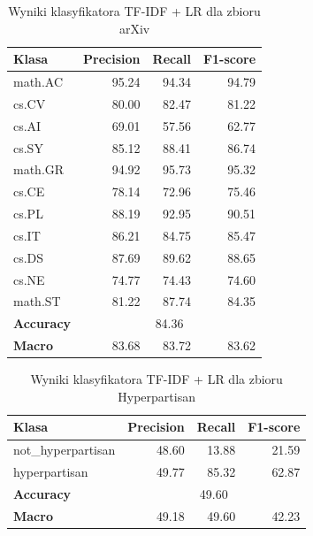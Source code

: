\documentclass[a4paper,11pt,twoside]{report}
\theoremstyle{definition}
\begin{document}
\begin{table}[h!]
\centering
\caption{Wyniki klasyfikatora TF-IDF + LR dla zbioru arXiv}
\label{tab:baseline-arxiv}
\smallskip
\footnotesize
\begin{tabular}{@{}lrrr@{}}
\toprule
\textbf{Klasa} & \textbf{Precision} & \textbf{Recall} & \textbf{F1-score} \\
\midrule
math.AC & 95.24 & 94.34 & 94.79 \\
cs.CV   & 80.00 & 82.47 & 81.22 \\
cs.AI   & 69.01 & 57.56 & 62.77 \\
cs.SY   & 85.12 & 88.41 & 86.74 \\
math.GR & 94.92 & 95.73 & 95.32 \\
cs.CE   & 78.14 & 72.96 & 75.46 \\
cs.PL   & 88.19 & 92.95 & 90.51 \\
cs.IT   & 86.21 & 84.75 & 85.47 \\
cs.DS   & 87.69 & 89.62 & 88.65 \\
cs.NE   & 74.77 & 74.43 & 74.60 \\
math.ST & 81.22 & 87.74 & 84.35 \\
\midrule
\textbf{Accuracy} & \multicolumn{3}{c}{84.36} \\
\textbf{Macro} & 83.68 & 83.72 & 83.62 \\
\bottomrule
\end{tabular}
\end{table}


\begin{table}[h!]   
\centering
\caption{Wyniki klasyfikatora TF-IDF + LR dla zbioru Hyperpartisan}
\label{tab:baseline-hyper}
\smallskip
\small
\begin{tabular}{@{}lrrr@{}}
\toprule
\textbf{Klasa} & \textbf{Precision} & \textbf{Recall} & \textbf{F1-score} \\
\midrule
not\_hyperpartisan & 48.60 & 13.88 & 21.59 \\
hyperpartisan      & 49.77 & 85.32 & 62.87 \\
\midrule
\textbf{Accuracy} & \multicolumn{3}{c}{49.60} \\
\textbf{Macro} & 49.18 & 49.60 & 42.23 \\
\bottomrule
\end{tabular}
\end{table}



\FloatBarrier


\setcounter{table}{0}
\end{document}
